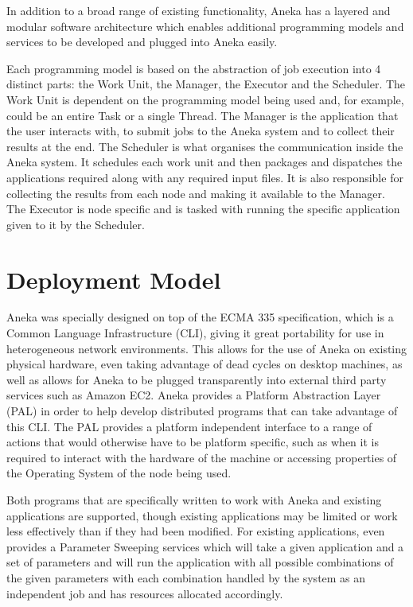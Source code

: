 In addition to a broad range of existing functionality, Aneka has a layered and modular software architecture which enables additional programming models and services to be developed and plugged into Aneka easily.

Each programming model is based on the abstraction of job execution into 4 distinct parts: the Work Unit, the Manager, the Executor and the Scheduler. The Work Unit is dependent on the programming model being used and, for example, could be an entire Task or a single Thread. The Manager is the application that the user interacts with, to submit jobs to the Aneka system and to collect their results at the end. The Scheduler is what organises the communication inside the Aneka system. It schedules each work unit and then packages and dispatches the applications required along with any required input files. It is also responsible for collecting the results from each node and making it available to the Manager. The Executor is node specific and is tasked with running the specific application given to it by the Scheduler\cite{Aneka}.

\section{Deployment Model}
Aneka was specially designed on top of the ECMA 335 specification, which is a Common Language Infrastructure (CLI), giving it great portability for use in heterogeneous network environments. This allows for the use of Aneka on existing physical hardware, even taking advantage of dead cycles on desktop machines, as well as allows for Aneka to be plugged transparently into external third party services such as Amazon EC2. Aneka provides a Platform Abstraction Layer (PAL) in order to help develop distributed programs that can take advantage of this CLI. The PAL provides a platform independent interface to a range of actions that would otherwise have to be platform specific, such as when it is required to interact with the hardware of the machine or accessing properties of the Operating System of the node being used.

Both programs that are specifically written to work with Aneka and existing applications are supported, though existing applications may be limited or work less effectively than if they had been modified. For existing applications, even provides a Parameter Sweeping services which will take a given application and a set of parameters and will run the application with all possible combinations of the given parameters with each combination handled by the system as an independent job and has resources allocated accordingly.

